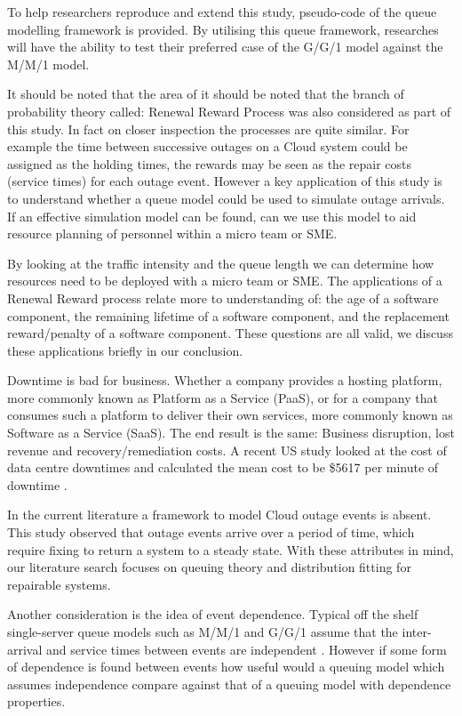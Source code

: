 \documentclass[5p]{elsarticle}
\begin{document}
To help researchers reproduce and extend this study, pseudo-code of the queue modelling framework is provided. By utilising this queue framework, researches will have the ability to test their preferred case of the G/G/1 model against the M/M/1 model.


It should be noted that the area of it should be noted that the branch of probability theory called: Renewal Reward Process \cite{blackwell1948renewal}\cite{jewell1967simple} was also considered as part of this study. In fact on closer inspection the processes are quite similar.  For example the time between successive outages on a Cloud system could be assigned as the holding times, the rewards may be seen as the repair costs (service times) for each outage event. However a key application of this study is to understand whether a queue model could be used to simulate outage arrivals. If an effective simulation model can be found, can we use this model to aid resource planning of personnel within a micro team or SME.

By looking at the traffic intensity and the queue length we can determine how resources need to be deployed with a micro team or SME. The applications of a Renewal Reward process relate more to understanding of: the age of a software component, the remaining lifetime of a software component, and the replacement reward/penalty of a software component. These questions are all valid, we discuss these applications briefly in our conclusion.

Downtime is bad for business. Whether a company provides a hosting platform, more commonly known as Platform as a Service (PaaS), or for a company that consumes such a platform to deliver their own services, more commonly known as Software as a Service (SaaS). The end result is the same: Business disruption, lost revenue and recovery/remediation costs. A recent US study  looked at the cost of data centre downtimes and calculated the mean cost to be \$5617 per minute of downtime \cite{DCcost}.

In the current literature a framework to model Cloud outage events is absent. This study observed that outage events arrive over a period of time, which require fixing to return a system to a steady state. With these attributes in mind, our literature search focuses on queuing theory and distribution fitting for repairable systems.

Another consideration is the idea of event dependence. Typical off the shelf single-server queue models such as M/M/1 and G/G/1 assume that the inter-arrival and service times between events are independent \cite{MM1}. However if some form of dependence is found between events how useful would a queuing model which assumes independence compare against that of a queuing model with dependence properties.
\end{document}
